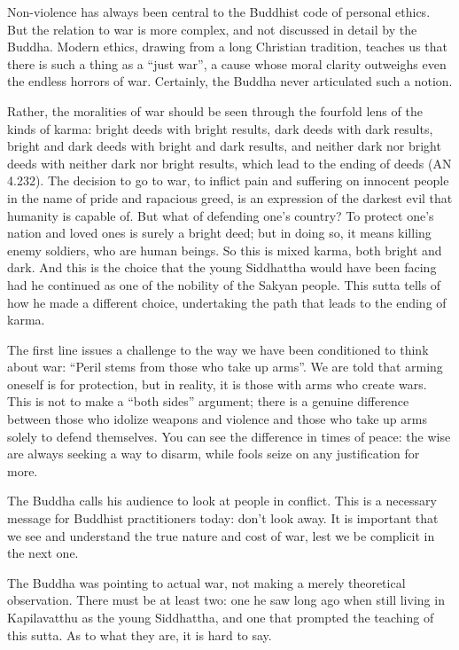 \documentclass[12pt,openany]{book}%
\begin{document}
Non-violence has always been central to the Buddhist code of personal ethics. But the relation to war is more complex, and not discussed in detail by the Buddha. Modern ethics, drawing from a long Christian tradition, teaches us that there is such a thing as a “just war”, a cause whose moral clarity outweighs even the endless horrors of war. Certainly, the Buddha never articulated such a notion.

Rather, the moralities of war should be seen through the fourfold lens of the kinds of karma: bright deeds with bright results, dark deeds with dark results, bright and dark deeds with bright and dark results, and neither dark nor bright deeds with neither dark nor bright results, which lead to the ending of deeds (AN 4.232). The decision to go to war, to inflict pain and suffering on innocent people in the name of pride and rapacious greed, is an expression of the darkest evil that humanity is capable of. But what of defending one’s country? To protect one’s nation and loved ones is surely a bright deed; but in doing so, it means killing enemy soldiers, who are human beings. So this is mixed karma, both bright and dark. And this is the choice that the young Siddhattha would have been facing had he continued as one of the nobility of the Sakyan people. This sutta tells of how he made a different choice, undertaking the path that leads to the ending of karma.

The first line issues a challenge to the way we have been conditioned to think about war: “Peril stems from those who take up arms”. We are told that arming oneself is for protection, but in reality, it is those with arms who create wars. This is not to make a “both sides” argument; there is a genuine difference between those who idolize weapons and violence and those who take up arms solely to defend themselves. You can see the difference in times of peace: the wise are always seeking a way to disarm, while fools seize on any justification for more.

The Buddha calls his audience to look at people in conflict. This is a necessary message for Buddhist practitioners today: don’t look away. It is important that we see and understand the true nature and cost of war, lest we be complicit in the next one.

The Buddha was pointing to actual war, not making a merely theoretical observation. There must be at least two: one he saw long ago when still living in Kapilavatthu as the young Siddhattha, and one that prompted the teaching of this sutta. As to what they are, it is hard to say.
\end{document}
